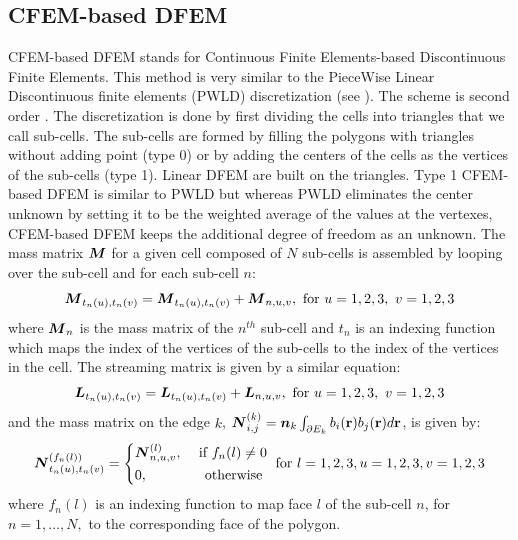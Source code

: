 \subsection{CFEM-based DFEM}
CFEM-based DFEM stands for Continuous Finite Elements-based Discontinuous
Finite Elements. This method is very similar to the PieceWise Linear
Discontinuous finite elements (PWLD) discretization (see ). 
The scheme is second order \cite{Warsa2008}. The discretization is done by
first dividing the cells into triangles that we call sub-cells. The sub-cells
are formed by filling the polygons with triangles without adding point (type
0) or by adding the centers of the cells as the vertices of the sub-cells
(type 1). Linear DFEM are built on the triangles. Type 1 CFEM-based DFEM is
similar to PWLD but whereas PWLD eliminates the center unknown by setting it
to be the weighted average of the values at the vertexes, CFEM-based DFEM keeps 
the additional degree of freedom as an unknown. The mass matrix 
$\boldsymbol{M}$ for a given cell composed of $N$ sub-cells is assembled by looping
over the sub-cell and for each sub-cell $n$:
\begin{equation}
  \boldsymbol{M}_{t_n(u),t_n(v)} = \boldsymbol{M}_{t_n(u),t_n(v)} + \boldsymbol{M}_{n,u,v}, 
  \textrm{ for }u=1,2,3,\ v=1,2,3
  \label{mass_cfem}
\end{equation}
where $\boldsymbol{M}_n$ is the mass matrix of the $n^{th}$ sub-cell and $t_n$ is an 
indexing function which maps the index of the vertices of the sub-cells to the 
index of the vertices in the cell. The streaming matrix is given by a similar 
equation:
\begin{equation}
  \boldsymbol{L}_{t_n(u),t_n(v)} = \boldsymbol{L}_{t_n(u),t_n(v)} + \boldsymbol{L}_{n,u,v}, 
  \textrm{ for }u=1,2,3,\ v=1,2,3
  \label{stream_cfem}
\end{equation}
and the mass matrix on the edge $k$, $\boldsymbol{N}_{i,j}^{(k)} = \boldsymbol{n}_k
\int_{\partial E_k} b_i(\mathbf{r}) b_j(\mathbf{r}) d\mathbf{r}$, is given by:
\begin{equation}
  \boldsymbol{N}_{t_n(u),t_n(v)}^{(f_n(l))} = \left\{
    \begin{aligned}
      & \boldsymbol{N}_{n,u,v}^{(l)}, & \textrm{ if }f_n(l)\neq 0\\
      & 0, & \textrm{ otherwise }
    \end{aligned}
  \right.
  \textrm{ for } l=1,2,3,u=1,2,3,v=1,2,3
\end{equation}
where $f_n(l)$ is an indexing function to map face $l$ of the sub-cell $n$,
for $n=1,\hdots,N,$ to the corresponding face of the polygon.

